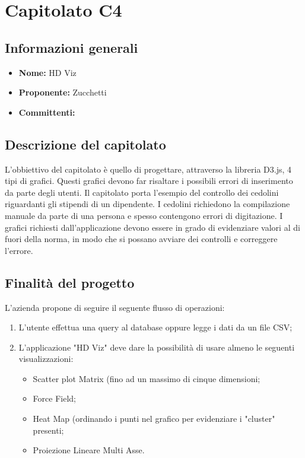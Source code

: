 \section{Capitolato C4}

\subsection{Informazioni generali}
\begin{itemize}
\item \textbf{Nome:} HD Viz
\item \textbf{Proponente:} Zucchetti
\item \textbf{Committenti:} \committenti{}
\end{itemize}

\subsection{Descrizione del capitolato}
L'obbiettivo del capitolato è quello di progettare, attraverso la libreria D3.js, 4 tipi di grafici. Questi grafici devono far risaltare i possibili errori di inserimento da parte degli utenti.
Il capitolato porta l'esempio del controllo dei cedolini riguardanti gli stipendi di un dipendente. I cedolini richiedono la compilazione manuale da parte di una persona e spesso contengono errori di digitazione. I grafici richiesti dall'applicazione devono essere in grado di evidenziare valori al di fuori della norma, in modo che si possano avviare dei controlli e correggere l'errore.

\subsection{Finalità del progetto}
L'azienda propone di seguire il seguente flusso di operazioni:
\begin{enumerate}
\item L'utente effettua una query al database oppure legge i dati da un file CSV;
\item L'applicazione "HD Viz" deve dare la possibilità di usare almeno le seguenti visualizzazioni:
	\begin{itemize}
	\item Scatter plot Matrix (fino ad un massimo di cinque dimensioni;
	\item Force Field;
	\item Heat Map (ordinando i punti nel grafico per evidenziare i "cluster" presenti;
	\item Proiezione Lineare Multi Asse.
	\end{itemize}
\end{enumerate}


